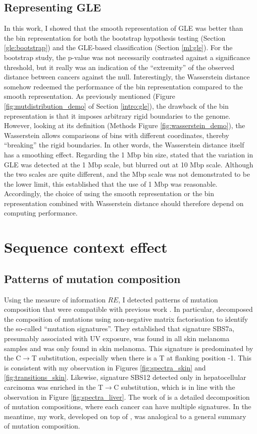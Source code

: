 \subsection{Representing GLE}
In this work, I showed that the smooth representation of GLE was better than the bin representation for both the bootstrap hypothesis testing (Section \ref{gle:bootstrap}) and the GLE-based classification (Section \ref{ml:gle}). For the bootstrap study, the p-value was not necessarily contrasted against a significance threshold, but it really was an indication of the ``extremity'' of the observed distance between cancers against the null. Interestingly, the Wasserstein distance somehow redeemed the performance of the bin representation compared to the smooth representation. As previously mentioned (Figure \ref{fig:mutdistribution_demo} of Section \ref{intro:gle}), the drawback of the bin representation is that it imposes arbitrary rigid boundaries to the genome. However, looking at its definition (Methods Figure \ref{fig:wasserstein_demo}), the Wasserstein allows comparisons of bins with different coordinates, thereby ``breaking'' the rigid boundaries. In other words, the Wasserstein distance itself has a smoothing effect. Regarding the 1 Mbp bin size, \citet{Hodgkinson2012TheGenomes} stated that the variation in GLE was detected at the 1 Mbp scale, but blurred out at 10 Mbp scale. Although the two scales are quite different, and the Mbp scale was not demonstrated to be the lower limit, this established that the use of 1 Mbp was reasonable. Accordingly, the choice of using the smooth representation or the bin representation combined with Wasserstein distance should therefore depend on computing performance. 

\section{Sequence context effect}
\subsection{Patterns of mutation composition}
Using the measure of information $RE$, I detected patterns of mutation composition that were compatible with previous work \citep[Chapter \ref{sce};][]{Alexandrov2020}. In particular, \citet{Alexandrov2020} decomposed the composition of mutations using non-negative matrix factorisation to identify the so-called ``mutation signatures''. They established that signature SBS7a, presumably associated with UV exposure, was found in all skin melanoma samples and was only found in skin melanoma. This signature is predominated by the C$\rightarrow$T substitution, especially when there is a T at flanking position -1. This is consistent with my observation in Figures \ref{fig:spectra_skin} and \ref{fig:transitions_skin}. Likewise, signature SBS12 detected only in hepatocellular carcinoma was enriched in the T$\rightarrow$C substitution, which is in line with the observation in Figure \ref{fig:spectra_liver}. The work of \citet{Alexandrov2020} is a detailed decomposition of mutation compositions, where each cancer can have multiple signatures. In the meantime, my work, developed on top of \citet{Zhu2017}, was analogical to a general summary of mutation composition. 

